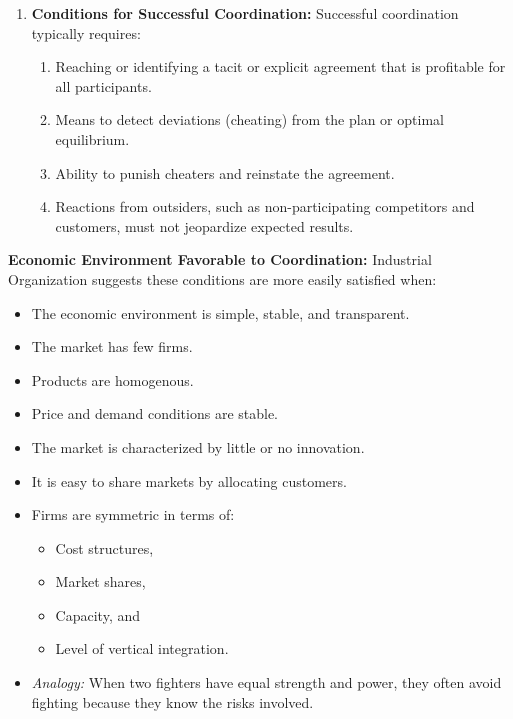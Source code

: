 \begin{enumerate}
            \item \textbf{Conditions for Successful Coordination:}
            Successful coordination typically requires:
            \begin{enumerate}
                \item Reaching or identifying a tacit or explicit agreement that is profitable for all participants.
                \item Means to detect deviations (cheating) from the plan or optimal equilibrium.
                \item Ability to punish cheaters and reinstate the agreement.
                \item Reactions from outsiders, such as non-participating competitors and customers, must not jeopardize expected results.
            \end{enumerate}
        \end{enumerate}
        
        \textbf{Economic Environment Favorable to Coordination:}
        Industrial Organization suggests these conditions are more easily satisfied when:
        \begin{itemize}
            \item The economic environment is simple, stable, and transparent.
            \item The market has few firms.
            \item Products are homogenous.
            \item Price and demand conditions are stable.
            \item The market is characterized by little or no innovation.
            \item It is easy to share markets by allocating customers.
            \item Firms are symmetric in terms of:
            \begin{itemize}
                \item Cost structures,
                \item Market shares,
                \item Capacity, and
                \item Level of vertical integration.
            \end{itemize}
            \item \textit{Analogy:} When two fighters have equal strength and power, they often avoid fighting because they know the risks involved.
        \end{itemize}
\newpage
